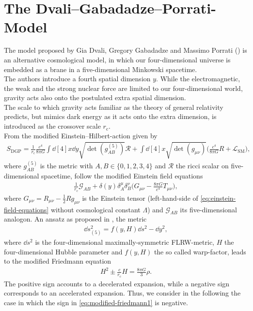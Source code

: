 \chapter{The Dvali--Gabadadze--Porrati-Model}
\label{chap:the-dvali-gabadadze-porrati-model}
\thispagestyle{empty}

The model proposed by Gia Dvali, Gregory Gabadadze and Massimo Porrati (\cite{Dvali2000}) is an alternative cosmological model, in which our four-dimensional universe is embedded as a brane in a five-dimensional Minkowski spacetime. \\
The authors introduce a fourth spatial dimension $y$. While the electromagnetic, the weak and the strong nuclear force are limited to our four-dimensional world, gravity acts also onto the postulated extra spatial dimension. \\
The scale to which gravity acts familiar as the theory of general relativity predicts, but mimics dark energy as it acts onto the extra dimension, is introduced as the crossover scale $r_{\text{c}}$. \\
From the modified Einstein--Hilbert-action given by 
\begin{align}
    S_{\text{DGP}} = \frac{1}{r_{\text{c}}} \frac{c^4}{8\pi G} \int \dd[4]{x} \dd{y} \sqrt{\det(g_{AB}^{(5)})} \mathcal{R} + \int \dd[4]{x} \sqrt{\det(g_{\mu \nu})} \biggl(\frac{c^4}{8 \pi G} R + \mathcal{L}_{\text{SM}} \biggr),
\end{align}
where $g_{AB}^{(5)}$ is the metric with $A, B \in \{0, 1, 2, 3, 4\}$ and $\mathcal{R}$ the ricci scalar on five-dimensional spacetime, follow the modified Einstein field equations 
\begin{align}
    \frac{1}{r_{\text{c}}} \mathcal{G}_{AB} + \delta(y) \delta_{A}^{\mu} \delta_{B}^{\nu} \biggl( G_{\mu \nu} - \frac{8\pi G}{c^4} T_{\mu \nu} \biggr), 
\end{align}
where $G_{\mu \nu} = R_{\mu \nu} - \frac{1}{2} R g_{\mu \nu}$ is the Einstein tensor (left-hand-side of \eqref{eq:einstein-field-equations} without cosmological constant $\Lambda$) and $\mathcal{G}_{AB}$ its five-dimensional analogon. An ansatz as proposed in \cite{Dvali2003}, the metric 
\begin{align}
    \dd{s}_{(5)}^2 = f(y,H) \dd{s}^2 - \dd{y}^2, 
\end{align}
where $\dd{s}^2$ is the four-dimensional maximally-symmetric FLRW-metric, $H$ the four-dimensional Hubble parameter and $f(y, H)$ the so called warp-factor, leads to the modified Friedmann equation
\begin{align}
    H^{2} \pm \frac{c}{r_{\text{c}}}H = \frac{8 \pi G}{3} \rho.  \label{eq:modified-friedmann1}
\end{align}
The positive sign accounts to a decelerated expansion, while a negative sign corresponds to an accelerated expansion. Thus, we consider in the following the case in which the sign in \eqref{eq:modified-friedmann1} is negative. \\

